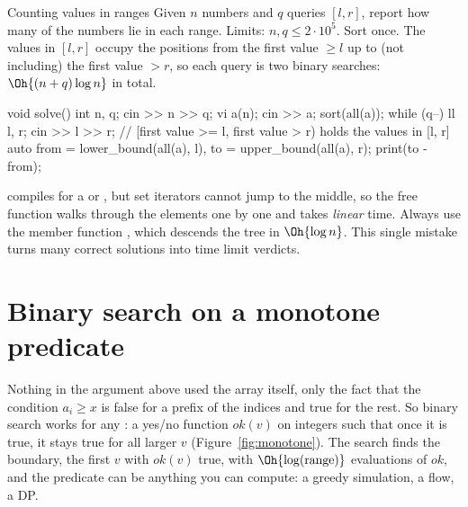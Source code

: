 \begin{problem}{Counting values in ranges}
Given $n$ numbers and $q$ queries $[l, r]$, report how many of the numbers lie in each range. Limits: $n, q \le 2\cdot10^5$.
\solution Sort once. The values in $[l, r]$ occupy the positions from the first value $\ge l$ up to (not including) the first
value $> r$, so each query is two binary searches: $\Oh{(n + q)\log n}$ in total.
\end{problem}

\begin{code}
void solve() {
    int n, q;
    cin >> n >> q;
    vi a(n);
    cin >> a;
    sort(all(a));
    while (q--) {
        ll l, r;
        cin >> l >> r;
        // [first value >= l, first value > r) holds the values in [l, r]
        auto from = lower_bound(all(a), l), to = upper_bound(all(a), r);
        print(to - from);
    }
}
\end{code}

\begin{pitfall}
 compiles for a  or , but set iterators cannot jump to the middle, so the free
function walks through the elements one by one and takes \emph{linear} time. Always use the member function
, which descends the tree in $\Oh{\log n}$. This single mistake turns many correct solutions into time
limit verdicts.
\end{pitfall}

\section[Binary search on a monotone predicate]{Binary search on a monotone predicate \hfill \silver}\label{sec:predicate}

Nothing in the argument above used the array itself, only the fact that the condition $a_i \ge x$ is false for a prefix of
the indices and true for the rest. So binary search works for any : a yes/no function
$\mathit{ok}(v)$ on integers such that once it is true, it stays true for all larger $v$ (Figure~\ref{fig:monotone}). The
search finds the boundary, the first $v$ with $\mathit{ok}(v)$ true, with $\Oh{\log(\text{range})}$ evaluations of
$\mathit{ok}$, and the predicate can be anything you can compute: a greedy simulation, a flow, a DP.

